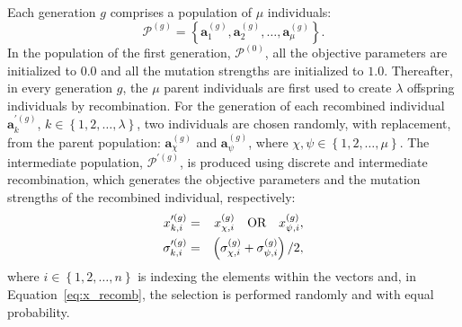 Each generation $g$ comprises a population of $\mu$ individuals:
\begin{displaymath}
\mathcal{P}^{\left(g\right)} = \left\{\mathbf{a}_1^{\left(g\right)}, 
\mathbf{a}_2^{\left(g\right)},\dots,\mathbf{a}_{\mu}^{\left(g\right)}\right\}.
\end{displaymath}
In the population of the first generation, $\mathcal{P}^{\left(0\right)}$, all the objective parameters are initialized to $0.0$ and all the mutation strengths are initialized to $1.0$. Thereafter, in every generation $g$, the $\mu$ parent individuals are first used to create $\lambda$ offspring individuals by recombination. For the generation of each recombined individual $\mathbf{a}^{\prime\left(g\right)}_k$, $k\in\left\{1,2,\dots,\lambda\right\}$, two individuals are chosen randomly, with replacement, from the parent population: $\mathbf{a}^{\left(g\right)}_{\chi}$ and $\mathbf{a}^{\left(g\right)}_{\psi}$, where $\chi,\psi\in\left\{1,2,\dots,\mu\right\}$. The intermediate population,  $\mathcal{P}^{\prime \left(g\right)}$, is produced using discrete and intermediate recombination, which generates the objective parameters and the mutation strengths of the recombined individual, respectively:
\begin{eqnarray}
x_{k,i}^{\prime\left(g\right)} & = & x_{\chi,i}^{\left(g\right)} \textrm{\quad OR\quad} x_{\psi,i}^{\left(g\right)},\label{eq:x_recomb}\\
\sigma_{k,i}^{\prime\left(g\right)} & = & \left(\sigma_{\chi,i}^{\left(g\right)} + \sigma_{\psi,i}^{\left(g\right)}\right)/2,
\end{eqnarray}
where $i\in\left\{1,2,\dots,n\right\}$ is indexing the elements within the vectors and, in Equation~\ref{eq:x_recomb}, the selection is performed randomly and with equal probability.


